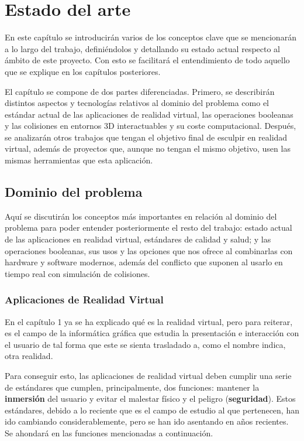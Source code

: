 \chapter{Estado del arte}

En este capítulo se introducirán varios de los conceptos clave que se mencionarán a lo largo del trabajo, definiéndolos y detallando su estado actual respecto al ámbito de este proyecto. Con esto se facilitará el entendimiento de todo aquello que se explique en los capítulos posteriores.

El capítulo se compone de dos partes diferenciadas. Primero, se describirán distintos aspectos y tecnologías relativos al dominio del problema como el estándar actual de las aplicaciones de realidad virtual, las operaciones booleanas y las colisiones en entornos 3D interactuables y su coste computacional. Después, se analizarán otros trabajos que tengan el objetivo final de esculpir en realidad virtual, además de proyectos que, aunque no tengan el mismo objetivo, usen las mismas herramientas que esta aplicación.

\section{Dominio del problema}

Aquí se discutirán los conceptos más importantes en relación al dominio del problema para poder entender posteriormente el resto del trabajo: estado actual de las aplicaciones en realidad virtual, estándares de calidad y salud; y las operaciones booleanas, sus usos y las opciones que nos ofrece al combinarlas con hardware y software modernos, además del conflicto que suponen al usarlo en tiempo real con simulación de colisiones.

\subsection{Aplicaciones de Realidad Virtual}

En el capítulo 1 ya se ha explicado qué es la realidad virtual, pero para reiterar, es el campo de la informática gráfica que estudia la presentación e interacción con el usuario de tal forma que este se sienta trasladado a, como el nombre indica, otra realidad.

Para conseguir esto, las aplicaciones de realidad virtual deben cumplir una serie de estándares que cumplen, principalmente, dos funciones: mantener la \textbf{inmersión} del usuario y evitar el malestar físico y el peligro (\textbf{seguridad})\cite{vrstandard}. Estos estándares, debido a lo reciente que es el campo de estudio al que pertenecen, han ido cambiando considerablemente, pero se han ido asentando en años recientes. Se ahondará en las funciones mencionadas a continuación.

